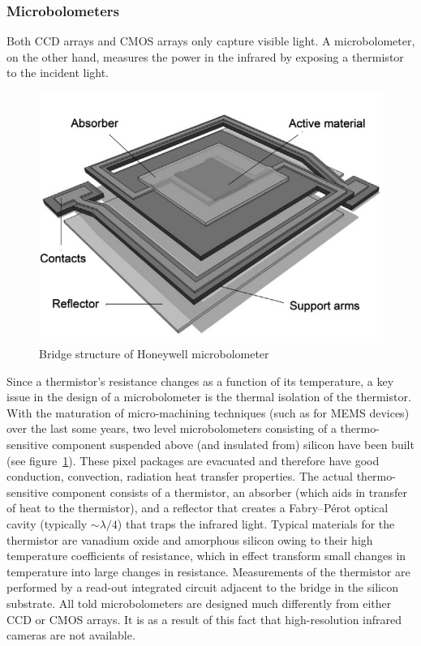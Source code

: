 \subsubsection{Microbolometers}
Both CCD arrays and CMOS arrays only capture visible light.
%
A microbolometer, on the other hand, measures the power in the infrared by exposing a thermistor to the incident light.
%
\begin{figure}[b]
	\center
	\includegraphics[width=.7\linewidth,keepaspectratio]{figures/background/microbolometer2.png}
	\caption{Bridge structure of Honeywell microbolometer\cite{KESIM2014245}}
	\label{fig:microbolometer}
\end{figure}
%
Since a thermistor's resistance changes as a function of its temperature, a key issue in the design of a microbolometer is the thermal isolation of the thermistor.
%
With the maturation of micro-machining techniques (such as for MEMS devices) over the last some years, two level microbolometers consisting of a thermo-sensitive component suspended above (and insulated from) silicon have been built (see figure~\ref{fig:microbolometer}).
%
These pixel packages are evacuated and therefore have good conduction, convection, radiation heat transfer properties.
%
The actual thermo-sensitive component consists of a thermistor, an absorber (which aids in transfer of heat to the thermistor), and a reflector that creates a Fabry–Pérot optical cavity (typically ${\sim}\lambda/4$\cite{bolometer}) that traps the infrared light.
%
Typical materials for the thermistor are vanadium oxide and amorphous silicon owing to their high temperature coefficients of resistance\cite{bolometer}, which in effect transform small changes in temperature into large changes in resistance.
%
Measurements of the thermistor are performed by a read-out integrated circuit adjacent to the bridge in the silicon substrate.
%
All told microbolometers are designed much differently from either CCD or CMOS arrays.
%
It is as a result of this fact that high-resolution infrared cameras are not available.

